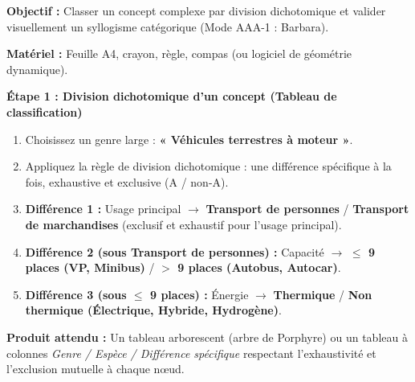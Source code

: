 \documentclass[11pt]{article}
\newcommand{\cle}[1]{{\popxbold\color{popdark}#1}}
\begin{document}
\begin{experience}
\textbf{Objectif :} Classer un concept complexe par division dichotomique et valider visuellement un syllogisme catégorique (Mode AAA-1 : Barbara).

\textbf{Matériel :} Feuille A4, crayon, règle, compas (ou logiciel de géométrie dynamique).

\textbf{Étape 1 : Division dichotomique d'un concept (Tableau de classification)}
\begin{enumerate}
    \item Choisissez un genre large : \textbf{« Véhicules terrestres à moteur »}.
    \item Appliquez la \cle{règle de division dichotomique} : une différence spécifique à la fois, exhaustive et exclusive (A / non-A).
    \item \textbf{Différence 1 :} Usage principal $\rightarrow$ \textbf{Transport de personnes} / \textbf{Transport de marchandises} (exclusif et exhaustif pour l'usage principal).
    \item \textbf{Différence 2 (sous Transport de personnes) :} Capacité $\rightarrow$ \textbf{$\le$ 9 places (VP, Minibus)} / \textbf{$>$ 9 places (Autobus, Autocar)}.
    \item \textbf{Différence 3 (sous $\le$ 9 places) :} Énergie $\rightarrow$ \textbf{Thermique} / \textbf{Non thermique (Électrique, Hybride, Hydrogène)}.
\end{enumerate}
\textbf{Produit attendu :} Un tableau arborescent (arbre de Porphyre) ou un tableau à colonnes \textit{Genre / Espèce / Différence spécifique} respectant l'exhaustivité et l'exclusion mutuelle à chaque nœud.


\end{experience}
\end{document}
